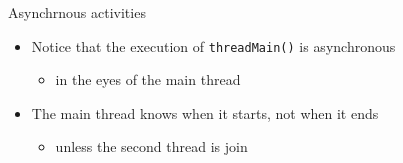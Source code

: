\documentclass{beamer}\mode<presentation>{\usetheme{AMSBolognaFC}}
\begin{document}
\begin{frame}[allowframebreaks]
    \framebreak

    \begin{alertblock}{Asynchrnous activities}
        \begin{itemize}
            \item Notice that the execution of \texttt{threadMain()} is \alert{asynchronous}
            \begin{itemize}
                \item in the eyes of the main thread
            \end{itemize}

            \item The main thread knows when it starts, not when it ends
            \begin{itemize}
                \item unless the second thread is join
            \end{itemize}
        \end{itemize}
    \end{alertblock}
\end{frame}
\end{document}
